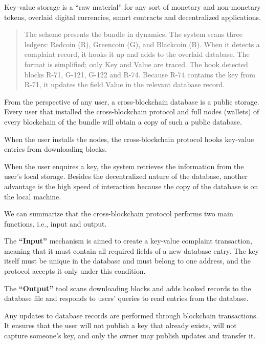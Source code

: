 \begin{multicols}{2}
Key-value storage is a “raw material” for any sort of monetary and non-monetary tokens, overlaid digital currencies, smart contracts and decentralized applications.

\begin{quote}
The scheme presents the bundle in dynamics. The system scans three ledgers: Redcoin (R), Greencoin (G), and Blackcoin (B). When it detects a complaint record, it hooks it up and adds to the overlaid database. The format is simplified; only Key and Value are traced. The hook detected blocks R-71, G-121, G-122 and R-74. Because R-74 contains the key from R-71, it updates the field Value in the relevant database record. 
\end{quote}

From the perspective of any user, a cross-blockchain database is a public storage. Every user that installed the cross-blockchain protocol and full nodes (wallets) of every blockchain of the bundle will obtain a copy of such a public database.

When the user installs the nodes, the cross-blockchain protocol hooks key-value entries from downloading blocks.

When the user enquires a key, the system retrieves the information from the user’s local storage. Besides the decentralized nature of the database, another advantage is the high speed of interaction because the copy of the database is on the local machine.

We can summarize that the cross-blockchain protocol performs two main functions, i.e., input and output.

The \textbf{“Input”} mechanism is aimed to create a key-value complaint transaction, meaning that it must contain all required fields of a new database entry. The key itself must be unique in the database and must belong to one address, and the protocol accepts it only under this condition.

The \textbf{“Output”} tool scans downloading blocks and adds hooked records to the database file and responds to users’ queries to read entries from the database.

Any updates to database records are performed through blockchain transactions. It ensures that the user will not publish a key that already exists, will not capture someone’s key, and only the owner may publish updates and transfer it.


\end{multicols}
